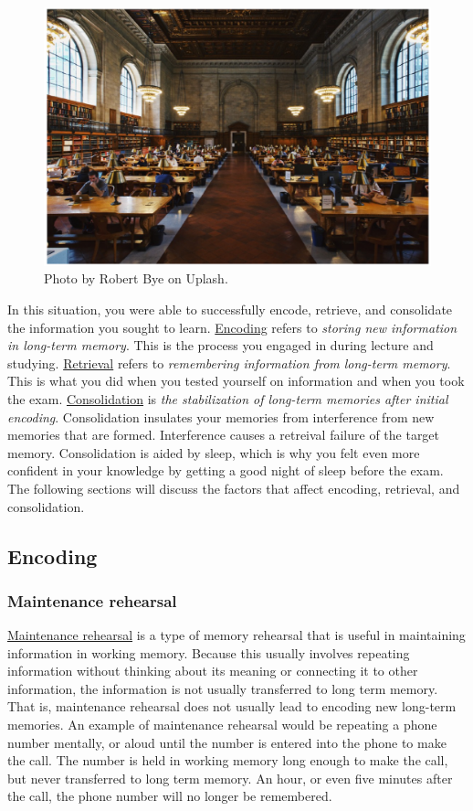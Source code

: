 \documentclass[
]{krantz}
\begin{document}
\begin{figure}

{\centering \includegraphics[width=0.6\linewidth]{images/ch5/fig3} 

}

\caption{Photo by Robert Bye on Uplash.}\label{fig:library}
\end{figure}

In this situation, you were able to successfully encode, retrieve, and consolidate the information you sought to learn. \protect\hyperlink{encoding}{Encoding} refers to \emph{storing new information in long-term memory}. This is the process you engaged in during lecture and studying. \protect\hyperlink{retrieval}{Retrieval} refers to \emph{remembering information from long-term memory}. This is what you did when you tested yourself on information and when you took the exam. \protect\hyperlink{consolidation}{Consolidation} is \emph{the stabilization of long-term memories after initial encoding}. Consolidation insulates your memories from interference from new memories that are formed. Interference causes a retreival failure of the target memory. Consolidation is aided by sleep, which is why you felt even more confident in your knowledge by getting a good night of sleep before the exam. The following sections will discuss the factors that affect encoding, retrieval, and consolidation.

\hypertarget{encoding}{%
\subsection*{Encoding}\label{encoding}}


\hypertarget{maintenance-rehearsal}{%
\subsubsection*{Maintenance rehearsal}\label{maintenance-rehearsal}}


\protect\hyperlink{maintenance-rehearsal}{Maintenance rehearsal} is a type of memory rehearsal that is useful in maintaining information in working memory. Because this usually involves repeating information without thinking about its meaning or connecting it to other information, the information is not usually transferred to long term memory. That is, maintenance rehearsal does not usually lead to encoding new long-term memories. An example of maintenance rehearsal would be repeating a phone number mentally, or aloud until the number is entered into the phone to make the call. The number is held in working memory long enough to make the call, but never transferred to long term memory. An hour, or even five minutes after the call, the phone number will no longer be remembered.
\end{document}
